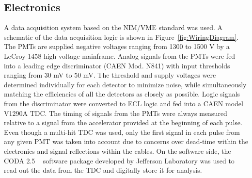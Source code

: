 \subsection{Electronics}
\label{sec:electronics}
A data acquisition system based on the NIM/VME standard was used.
A schematic of the data acquisition logic is shown in Figure~\ref{fig:WiringDiagram}.
The PMTs are supplied negative voltages ranging from 1300 to 1500 V by a LeCroy 1458 high voltage mainframe.
Analog signals from the PMTs were fed into a leading edge discriminator (CAEN Mod. N841) with input thresholds ranging from 30 mV to 50 mV.
The threshold and supply voltages were determined individually for each detector to minimize noise, while simultaneously matching the efficiencies of all the detectors as closely as possible.
Logic signals from the discriminator were converted to ECL logic and fed into a CAEN model V1290A TDC.
The timing of signals from the PMTs were always measured relative to a signal from the accelerator provided at the beginning of each pulse.
Even though a multi-hit TDC was used, only the first signal in each pulse from any given PMT was taken into account due to concerns over dead-time within the electronics and signal reflections within the cables.
On the software side, the CODA 2.5 ~\cite{CODA} software package developed by Jefferson Laboratory was used to read out the data from the TDC and digitally store it for analysis.


